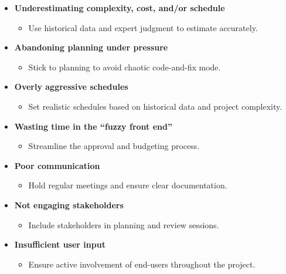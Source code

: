 \documentclass[10pt]{article}
\begin{document}
\begin{multicols}{5}
    \begin{block}
        \begin{itemize}
          \item \textbf{Underestimating complexity, cost, and/or schedule}
          \begin{itemize}
            \item Use historical data and expert judgment to estimate accurately.
          \end{itemize}
          \item \textbf{Abandoning planning under pressure}
          \begin{itemize}
            \item Stick to planning to avoid chaotic code-and-fix mode.
          \end{itemize}
          \item \textbf{Overly aggressive schedules}
          \begin{itemize}
            \item Set realistic schedules based on historical data and project complexity.
          \end{itemize}
          \item \textbf{Wasting time in the “fuzzy front end”}
          \begin{itemize}
            \item Streamline the approval and budgeting process.
          \end{itemize}
        \end{itemize}
        \end{block}
        
        \begin{block}
        \begin{itemize}
          \item \textbf{Poor communication}
          \begin{itemize}
            \item Hold regular meetings and ensure clear documentation.
          \end{itemize}
          \item \textbf{Not engaging stakeholders}
          \begin{itemize}
            \item Include stakeholders in planning and review sessions.
          \end{itemize}
          \item \textbf{Insufficient user input}
          \begin{itemize}
            \item Ensure active involvement of end-users throughout the project.
          \end{itemize}
        \end{itemize}
        \end{block}
        

\end{multicols}
\end{document}
